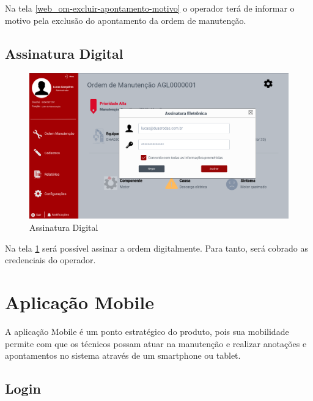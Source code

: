 {Na tela \ref{web_om-excluir-apontamento-motivo} o operador terá de informar o motivo pela exclusão do apontamento da ordem de manutenção.

\newpage
\subsection{Assinatura Digital}

\begin{figure}[htb]
	\caption{\label{web_om-assinatura}Assinatura Digital}
	\begin{center}
		\includegraphics[scale=0.40]{./Figuras/web/om-assinatura.png}
	\end{center}
\end{figure}

Na tela \ref{web_om-assinatura} será possível assinar a ordem digitalmente. Para tanto, será cobrado as credenciais do operador.

\newpage
\section{Aplicação Mobile}
A aplicação Mobile é um ponto estratégico do produto, pois sua mobilidade permite com que os técnicos possam atuar na manutenção e realizar anotações e apontamentos no sistema através de um smartphone ou tablet.

\subsection{Login}

}
